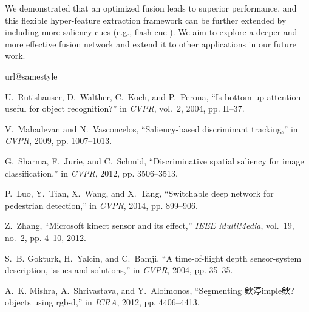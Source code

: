 \documentclass[journal]{IEEEtran}
\begin{document}
We demonstrated that an optimized fusion leads to superior performance, and this flexible hyper-feature extraction framework can be further extended by including more saliency cues (e.g., flash cue \cite{shenfeng2014}). We aim to explore a deeper and more effective fusion network and extend it to other applications in our future work.
\begin{thebibliography}{10}
\providecommand{\url}[1]{#1}
\csname url@samestyle\endcsname
\providecommand{\newblock}{\relax}
\providecommand{\bibinfo}[2]{#2}
\providecommand{\BIBentrySTDinterwordspacing}{\spaceskip=0pt\relax}
\providecommand{\BIBentryALTinterwordstretchfactor}{4}
\providecommand{\BIBentryALTinterwordspacing}{\spaceskip=\fontdimen2\font plus
\BIBentryALTinterwordstretchfactor\fontdimen3\font minus
  \fontdimen4\font\relax}
\providecommand{\BIBforeignlanguage}[2]{{\expandafter\ifx\csname l@#1\endcsname\relax
\typeout{** WARNING: IEEEtran.bst: No hyphenation pattern has been}\typeout{** loaded for the language `#1'. Using the pattern for}\typeout{** the default language instead.}\else
\language=\csname l@#1\endcsname
\fi
#2}}
\providecommand{\BIBdecl}{\relax}
\BIBdecl

U.~Rutishauser, D.~Walther, C.~Koch, and P.~Perona, ``Is bottom-up attention
  useful for object recognition?'' in \emph{CVPR}, vol.~2, 2004, pp. II--37.

V.~Mahadevan and N.~Vasconcelos, ``Saliency-based discriminant tracking,'' in
  \emph{CVPR}, 2009, pp. 1007--1013.

G.~Sharma, F.~Jurie, and C.~Schmid, ``Discriminative spatial saliency for image
  classification,'' in \emph{CVPR}, 2012, pp. 3506--3513.

P.~Luo, Y.~Tian, X.~Wang, and X.~Tang, ``Switchable deep network for pedestrian
  detection,'' in \emph{CVPR}, 2014, pp. 899--906.

Z.~Zhang, ``Microsoft kinect sensor and its effect,'' \emph{IEEE MultiMedia},
  vol.~19, no.~2, pp. 4--10, 2012.

S.~B. Gokturk, H.~Yalcin, and C.~Bamji, ``A time-of-flight depth sensor-system
  description, issues and solutions,'' in \emph{CVPR}, 2004, pp. 35--35.

A.~K. Mishra, A.~Shrivastava, and Y.~Aloimonos, ``Segmenting 鈥渟imple鈥?
  objects using rgb-d,'' in \emph{ICRA}, 2012, pp. 4406--4413.


\end{thebibliography}
\end{document}
